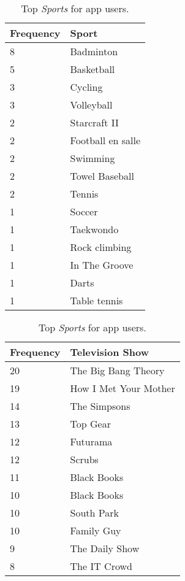 \begin{table}[h]
\begin{minipage}[b]{.50\textwidth}
\centering
  \begin{tabular}{|l|l|} %
  \hline
  		\textbf{Frequency} & \textbf{Sport} \\ \hline
		8 & Badminton \\ \hline
		5 & Basketball \\ \hline
		3 & Cycling \\ \hline
		3 & Volleyball \\ \hline
		2 & Starcraft II \\ \hline
		2 & Football en salle \\ \hline
		2 & Swimming \\ \hline
		2 & Towel Baseball \\ \hline
		2 & Tennis \\ \hline
		1 & Soccer \\ \hline
		1 & Taekwondo \\ \hline
		1 & Rock climbing \\ \hline
		1 & In The Groove \\ \hline
		1 & Darts \\ \hline
		1 & Table tennis \\ \hline
  \end{tabular}
  \caption{Top \emph{Sports} for app users.}
\end{minipage}
\begin{minipage}[b]{.50\textwidth}
\centering
  \begin{tabular}{|l|l|} %
  \hline
  	\textbf{Frequency} & \textbf{Television Show} \\ \hline
		20 & The Big Bang Theory \\ \hline
		19 & How I Met Your Mother \\ \hline
		14 & The Simpsons \\ \hline
		13 & Top Gear \\ \hline
		12 & Futurama \\ \hline
		12 & Scrubs \\ \hline
		11 & Black Books \\ \hline
		10 & Black Books \\ \hline
		10 & South Park \\ \hline
		10 & Family Guy \\ \hline
		9 & The Daily Show \\ \hline
		8 & The IT Crowd \\ \hline

\end{tabular}
\end{minipage}
\end{table}
